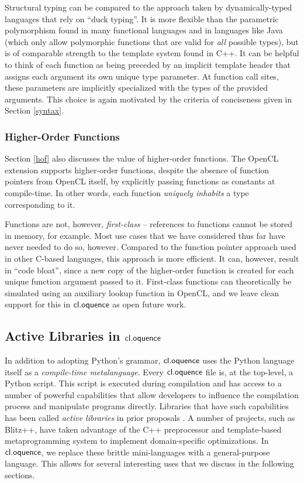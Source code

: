 \documentclass[10pt, conference, compsocconf]{IEEEtran}
\begin{document}
Structural typing can be compared to the approach taken by dynamically-typed languages that rely on ``duck typing''. It is more flexible than the parametric polymorphism found in many functional languages and in languages like Java (which only allow polymorphic functions that are valid for {\it all} possible types), but is of comparable strength to the template system found in C++. It can be helpful to think of each function as being preceded by an implicit template header that assigns each argument its own unique type parameter. At function call sites, these parameters are implicitly specialized with the types of the provided arguments. This choice is again motivated by the criteria of conciseness given in Section \ref{syntax}.

\subsubsection{Higher-Order Functions}
Section \ref{hof} also discusses the value of higher-order functions. The OpenCL extension supports higher-order functions, despite the absence of function pointers from OpenCL itself, by explicitly passing functions as constants at compile-time. In other words, each function {\it uniquely inhabits} a type corresponding to it.

Functions are not, however, {\it first-class} -- references to functions cannot be stored in memory, for example. Most use cases that we have considered thus far have never needed to do so, however. Compared to the function pointer approach used in other C-based languages, this approach is more efficient. It can, however, result in ``code bloat'', since a new copy of the higher-order function is created for each unique function argument passed to it. First-class functions can theoretically be simulated using an auxiliary lookup function in OpenCL, and we leave clean support for this in $\textsf{cl.oquence}$ as open future work.

\subsection{Active Libraries in $\textsf{cl.oquence}$}
In addition to adopting Python's grammar, $\textsf{cl.oquence}$ uses the Python language itself as a {\it compile-time metalanguage}. Every $\textsf{cl.oquence}$ file is, at the top-level, a Python script. This script is executed during compilation and has access to a number of powerful capabilities that allow developers to influence the compilation process and manipulate programs directly. Libraries that have such capabilities has been called {\it active libraries} in prior proposals \cite{activelibraries}. A number of  projects, such as Blitz++, have taken advantage of the C++ preprocessor and template-based metaprogramming system to implement domain-specific optimizations. In $\textsf{cl.oquence}$, we replace these brittle mini-languages with a general-purpose language. This allows for several interesting uses that we discuss in the following sections.
\end{document}
